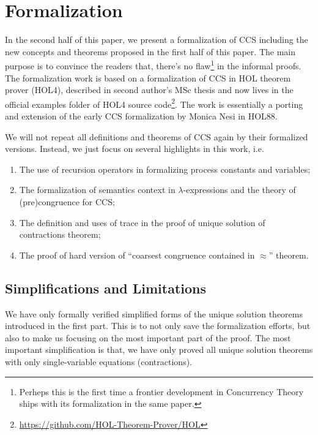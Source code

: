 \documentclass{eptcs} %
\begin{document}


\section{Formalization}

In the second half of this paper, we present a formalization of CCS
including the new concepts and theorems proposed in the first half of
this paper. The main purpose is to convince the readers that, there's no flaw\footnote{Perheps this is the first
  time a frontier development in Concurrency Theory ships with its
  formalization in the same paper.} in the informal proofs. The
formalization work is based on a formalization of CCS in HOL theorem
prover (HOL4), described in second author's MSc thesis
\cite{Chun:2017} and now lives in the official examples folder of HOL4 source
code\footnote{\url{https://github.com/HOL-Theorem-Prover/HOL}}.
The work is essentially a porting and extension of the early CCS
formalization by Monica Nesi \cite{Nesi} in HOL88.

We will not repeat all definitions and theorems of CCS again by their
formalized versions. Instead, we just focus on several highlights in
this work, i.e.
\begin{enumerate}
\item The use of recursion operators in formalizing process constants
  and variables;
\item The formalization of semantics context in $\lambda$-expressions and the theory of
  (pre)congruence for CCS;
\item The definition and uses of trace in the proof of unique solution of
  contractions theorem;
\item The proof of hard version of ``coarsest congruence
  contained in $\approx$'' theorem.
\end{enumerate}

\subsection{Simplifications and Limitations}

We have only formally verified simplified forms of the unique
solution theorems introduced in the first part. This is to not only
save the formalization efforts, but also to make us focusing on the most
important part of the proof. The most important simplification is
that, we have only proved all unique solution theorems with only single-variable equations
(contractions).
\end{document}
